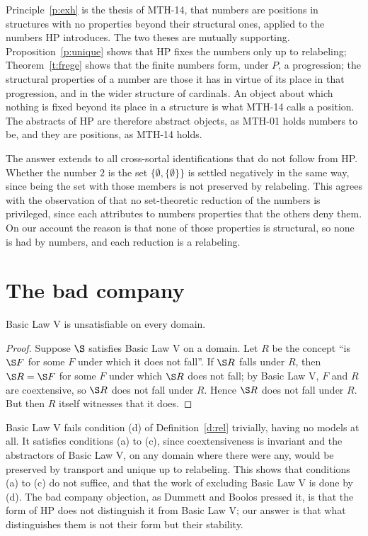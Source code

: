 \documentclass{situationist-preprint}
\begin{document}
Principle~\ref{p:exh} is the thesis of MTH-14, that numbers are positions in structures with no properties beyond their structural ones, applied to the numbers HP introduces. The two theses are mutually supporting. Proposition~\ref{p:unique} shows that HP fixes the numbers only up to relabeling; Theorem~\ref{t:frege} shows that the finite numbers form, under $P$, a progression; the structural properties of a number are those it has in virtue of its place in that progression, and in the wider structure of cardinals. An object about which nothing is fixed beyond its place in a structure is what MTH-14 calls a position. The abstracts of HP are therefore abstract objects, as MTH-01 holds numbers to be, and they are positions, as MTH-14 holds.

The answer extends to all cross-sortal identifications that do not follow from HP. Whether the number $2$ is the set $\{\emptyset, \{\emptyset\}\}$ is settled negatively in the same way, since being the set with those members is not preserved by relabeling. This agrees with the observation of \citet{Benacerraf1965} that no set-theoretic reduction of the numbers is privileged, since each attributes to numbers properties that the others deny them. On our account the reason is that none of those properties is structural, so none is had by numbers, and each reduction is a relabeling.

\section{The bad company}\label{s:bad}

\begin{proposition}\label{p:blv}
Basic Law V is unsatisfiable on every domain.
\end{proposition}

\begin{proof}
Suppose $\S$ satisfies Basic Law V on a domain. Let $R$ be the concept \enquote{is $\S F$ for some $F$ under which it does not fall}. If $\S R$ falls under $R$, then $\S R = \S F$ for some $F$ under which $\S R$ does not fall; by Basic Law V, $F$ and $R$ are coextensive, so $\S R$ does not fall under $R$. Hence $\S R$ does not fall under $R$. But then $R$ itself witnesses that it does.
\end{proof}

Basic Law V fails condition (d) of Definition~\ref{d:rel} trivially, having no models at all. It satisfies conditions (a) to (c), since coextensiveness is invariant and the abstractors of Basic Law V, on any domain where there were any, would be preserved by transport and unique up to relabeling. This shows that conditions (a) to (c) do not suffice, and that the work of excluding Basic Law V is done by (d). The bad company objection, as Dummett and Boolos pressed it, is that the form of HP does not distinguish it from Basic Law V; our answer is that what distinguishes them is not their form but their stability.
\end{document}
